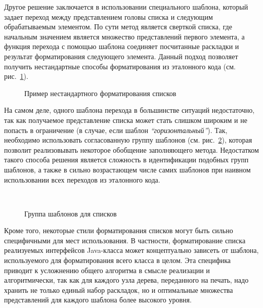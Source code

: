 Другое решение заключается в использовании специального шаблона, который
задает переход между представлением головы списка и следующим обрабатываемым
элементом. По сути метод является сверткой списка, где начальным значением
является множество представлений первого элемента, а функция перехода с помощью
шаблона соединяет
посчитанные раскладки и результат форматирования следующего элемента.
Данный подход позволяет получить нестандартные способы форматирования
из эталонного кода (см. рис.~\ref{fig:listGoodLine}).

\begin{figure}[h!]
  
  \caption{Пример нестандартного форматирования списков}
  \label{fig:listGoodLine}
\end{figure}

На самом деле, одного шаблона перехода 
в большинстве ситуаций недостаточно,
так как получаемое представление списка может стать слишком широким и не попасть
в ограничение (в случае, если шаблон \emph{``горизонтальный''}).
Так, необходимо использовать согласованную группу шаблонов
(см. рис.~\ref{fig:tmpltGroup}), которая
позволит реализовывать некоторое обобщение заполняющего метода.
Недостатком такого способа решения является сложность в идентификации подобных
групп шаблонов, а также в сильно возрастающем числе самих шаблонов при наивном
использовании всех переходов из эталонного кода.

\begin{figure}[h!]
  \centering
  ~
  \caption{Группа шаблонов для списков}
  \label{fig:tmpltGroup}
\end{figure}

Кроме того, некоторые стили
форматирования списков могут быть сильно специфичными для мест использования.
В частности, форматирование списка реализуемых интерфейсов Java-класса может
концептуально зависеть от шаблона, используемого для форматирования всего класса
в целом. Эта специфика приводит к усложнению общего алгоритма в смысле реализации
и алгоритмически, так как для каждого узла дерева, переданного на печать,
надо хранить не только единый набор раскладок, но и оптимальные
множества представлений для каждого шаблона более высокого уровня.

